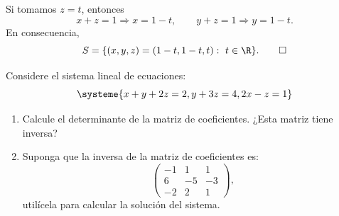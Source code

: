 \documentclass[11pt,respuestas,a4]{aleph-examen}
\begin{document}
\begin{preguntas}
\begin{respuesta}
\begin{enumerate}
Si tomamos $z=t$, entonces
\[
    x+z=1\Rightarrow x=1-t,
    \qquad
    y+z=1\Rightarrow y=1-t.
\]
En consecuencia,
\[
    S=\{(x,y,z)=(1-t,1-t,t):\ t\in\R\}.\qedhere
\]
\end{enumerate}
\end{respuesta}

\item 
    Considere el sistema lineal de ecuaciones:
    \[
        \systeme{x+y+2 z=2, y+3z=4, 2x-z=1}
    \]
    \begin{enumerate}
        \item Calcule el determinante de la matriz de coeficientes. ¿Esta matriz tiene inversa?
        \item Suponga que la inversa de la matriz de coeficientes es:
        \[
            \begin{pmatrix}
               -1 & 1 & 1\\
               6 & -5 & -3\\
               -2 & 2 & 1
            \end{pmatrix},
        \]
        utilícela para calcular la solución del sistema.
    \end{enumerate}


\end{preguntas}
\end{document}
